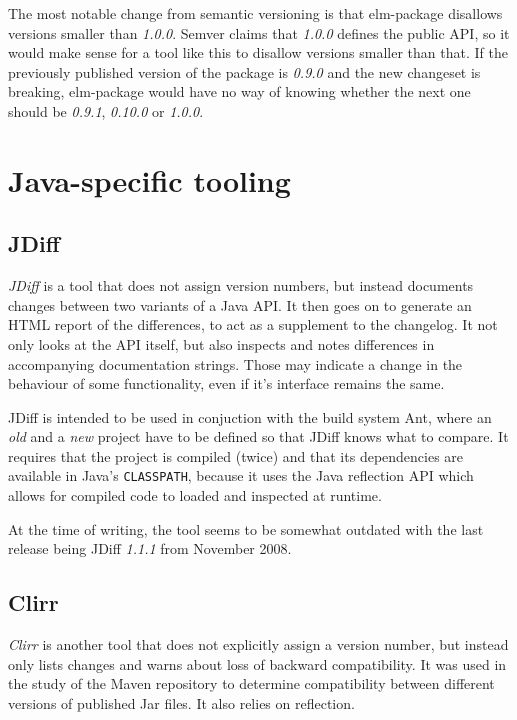 \documentclass{l4proj}
\newcommand\genericstyle{\lstset{basicstyle=\ttm}}
\newcommand\codeinline[1]{{\genericstyle\lstinline!#1!}}
\begin{document}
The most notable change from semantic versioning is that elm-package
disallows versions smaller than \textit{1.0.0}. Semver claims that \textit{1.0.0}
defines the public API, so it would make sense for a tool like this to
disallow versions smaller than that. If the previously published
version of the package is \textit{0.9.0} and the new changeset is breaking,
elm-package would have no way of knowing whether the next one should
be \textit{0.9.1}, \textit{0.10.0} or \textit{1.0.0}.

\section{Java-specific tooling}

\subsection{JDiff}

\textit{JDiff} \cite{JDiff} is a tool that does not assign version
numbers, but instead documents changes between two variants of a Java API.
It then goes on to generate an HTML report of the differences, to act
as a supplement to the changelog. It not only looks at the API itself,
but also inspects and notes differences in accompanying documentation
strings. Those may indicate a change in the behaviour of some functionality,
even if it's interface remains the same.

JDiff is intended to be used in conjuction with the build system Ant,
where an \textit{old} and a \textit{new} project have to be defined so
that JDiff knows what to compare. It requires that the project is
compiled (twice) and that its dependencies are available in Java's
\codeinline{CLASSPATH}, because it uses the Java reflection API which
allows for compiled code to loaded and inspected at runtime.

At the time of writing, the tool seems to be somewhat outdated with
the last release being JDiff \textit{1.1.1} from November 2008.

\subsection{Clirr}

\textit{Clirr} \cite{Clirr} is another tool that does not explicitly
assign a version number, but instead only lists changes and warns
about loss of backward compatibility. It was used in the study of the
Maven repository \cite{SemverMaven} to determine compatibility between
different versions of published Jar files. It also relies on reflection.
\end{document}

